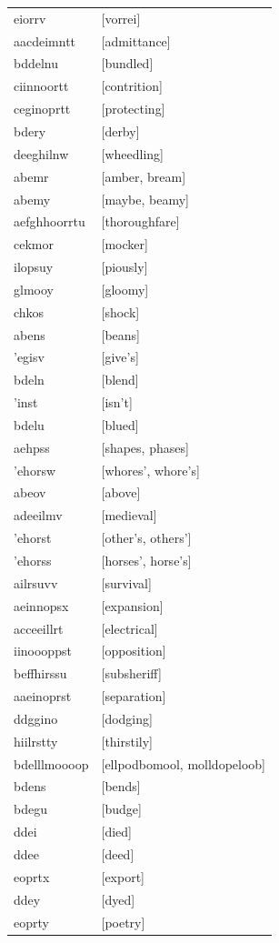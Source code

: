 \documentclass{article}
\begin{document}
\begin{tabular}{ll}
eiorrv & [vorrei] \\
aacdeimntt & [admittance] \\
bddelnu & [bundled] \\
ciinnoortt & [contrition] \\
ceginoprtt & [protecting] \\
bdery & [derby] \\
deeghilnw & [wheedling] \\
abemr & [amber, bream] \\
abemy & [maybe, beamy] \\
aefghhoorrtu & [thoroughfare] \\
cekmor & [mocker] \\
ilopsuy & [piously] \\
glmooy & [gloomy] \\
chkos & [shock] \\
abens & [beans] \\
'egisv & [give's] \\
bdeln & [blend] \\
'inst & [isn't] \\
bdelu & [blued] \\
aehpss & [shapes, phases] \\
'ehorsw & [whores', whore's] \\
abeov & [above] \\
adeeilmv & [medieval] \\
'ehorst & [other's, others'] \\
'ehorss & [horses', horse's] \\
ailrsuvv & [survival] \\
aeinnopsx & [expansion] \\
acceeillrt & [electrical] \\
iinoooppst & [opposition] \\
beffhirssu & [subsheriff] \\
aaeinoprst & [separation] \\
ddggino & [dodging] \\
hiilrstty & [thirstily] \\
bdelllmoooop & [ellpodbomool, molldopeloob] \\
bdens & [bends] \\
bdegu & [budge] \\
ddei & [died] \\
ddee & [deed] \\
eoprtx & [export] \\
ddey & [dyed] \\
eoprty & [poetry] \\

\end{tabular}
\end{document}
